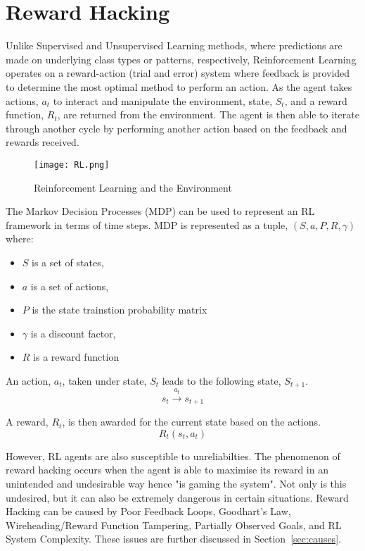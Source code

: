 \chapter{Reward Hacking}
\label{chap:chap5}
Unlike Supervised and Unsupervised Learning methods, where predictions are made on underlying class types or patterns, respectively, 
Reinforcement Learning operates on a reward-action (trial and error) system where feedback is provided to determine the most optimal method to perform an action.
As the agent takes actions, $a_t$ to interact and manipulate the environment, state, $S_t$, and a reward function, $R_t$, are returned from the environment. 
The agent is then able to iterate through another cycle by performing another action based on the feedback and rewards received.

\begin{figure}[H]
    \centering
    \caption{Reinforcement Learning and the Environment \cite{amiri_mehrpouyan_fridman_mallik_nallanathan_matolak_2018}}
    \texttt{[image: RL.png]}
    \label{fig:RL}
\end{figure}

The Markov Decision Processes (MDP) can be used to represent an RL framework in terms of time steps.
MDP is represented as a tuple, $(S, a, P, R, \gamma)$ where:
\begin{itemize}
    \item $S$ is a set of states,
    \item $a$ is a set of actions,
    \item $P$ is the state trainstion probability matrix
    \item $\gamma$ is a discount factor, 
    \item $R$ is a reward function 
\end{itemize}   

An action, $a_t$, taken under state, $S_t$ leads to the following state, $S_{t+1}$. 
\begin{equation}
    s_t \xrightarrow{a_t} s_{t+1}
\end{equation}

A reward, $R_t$, is then awarded for the current state based on the actions.
\begin{equation}
    R_t(s_t, a_t) 
\end{equation}

However, RL agents are also susceptible to unreliabilties. The phenomenon of reward hacking occurs when the agent is able to maximise its reward in an unintended and undesirable way hence "is gaming the system".
Not only is this undesired, but it can also be extremely dangerous in certain situations. 
Reward Hacking can be caused by Poor Feedback Loops, Goodhart's Law, Wireheading/Reward Function Tampering, Partially Observed Goals, and RL System Complexity. 
These issues are further discussed in Section~\ref{sec:causes}.

